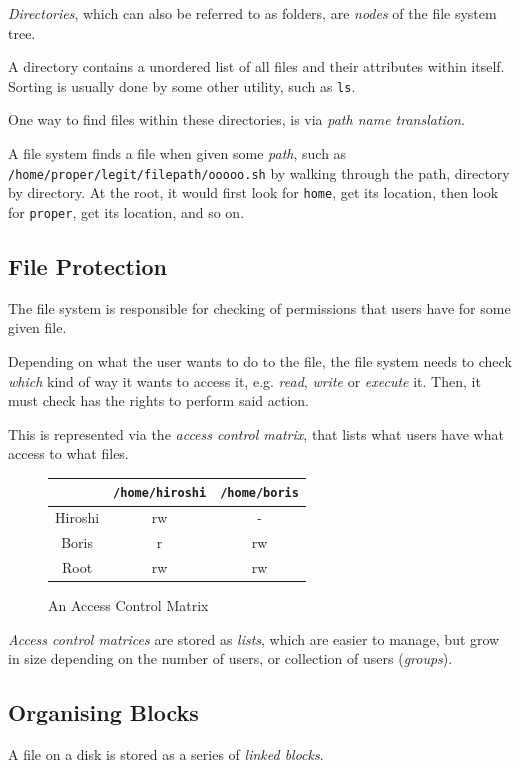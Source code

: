 \documentclass[a4]{article}
\begin{document}
\textit{Directories}, which can also be referred to as folders, are \textit{nodes} of the file system tree.

A directory contains a unordered list of all files and their attributes within itself. Sorting is usually done by some other utility, such as \texttt{ls}.

One way to find files within these directories, is via \textit{path name translation}.

A file system finds a file when given some \textit{path}, such as \texttt{/home/proper/legit/filepath/ooooo.sh} by walking through the path, directory by directory. At the root, it would first look for \texttt{home}, get its location, then look for \texttt{proper}, get its location, and so on.

\subsection{File Protection}

The file system is responsible for checking of permissions that users have for some given file.

Depending on what the user wants to do to the file, the file system needs to check \textit{which} kind of way it wants to access it, e.g. \textit{read}, \textit{write} or \textit{execute} it. Then, it must check has the rights to perform said action.

This is represented via the \textit{access control matrix}, that lists what users have what access to what files.

\begin{figure}[H]
  \centering
  \begin{tabular}{|c|c|c|}
    \hline
    & \texttt{/home/hiroshi} & \texttt{/home/boris}\\
    \hline
    Hiroshi & rw & -\\
    \hline
    Boris & r & rw\\
    \hline
    Root & rw & rw\\
    \hline
  \end{tabular}
  \caption{An Access Control Matrix}
\end{figure}

\textit{Access control matrices} are stored as \textit{lists}, which are easier to manage, but grow in size depending on the number of users, or collection of users (\textit{groups}).

\subsection{Organising Blocks}

A file on a disk is stored as a series of \textit{linked blocks}. 
\end{document}
